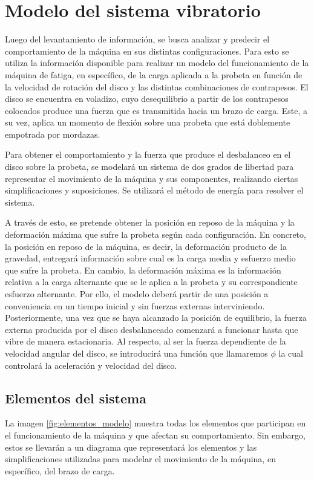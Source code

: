 \section{Modelo del sistema vibratorio}
Luego del levantamiento de información, se busca analizar y predecir el comportamiento de la máquina en sus distintas configuraciones. Para esto se utiliza la información disponible para realizar un modelo del funcionamiento de la máquina de fatiga, en específico, de la carga aplicada a la probeta en función de la velocidad de rotación del disco y las distintas combinaciones de contrapesos. El disco se encuentra en voladizo, cuyo desequilibrio a partir de los contrapesos colocados produce una fuerza que es transmitida hacia un brazo de carga. Este, a su vez, aplica un momento de flexión sobre una probeta que está doblemente empotrada por mordazas.

Para obtener el comportamiento y la fuerza que produce el desbalanceo en el disco sobre la probeta, se modelará un sistema de dos grados de libertad para representar el movimiento de la máquina y sus componentes, realizando ciertas simplificaciones y suposiciones. Se utilizará el método de energía para resolver el sistema.

A través de esto, se pretende obtener la posición en reposo de la máquina y la deformación máxima que sufre la probeta según cada configuración. En concreto, la posición en reposo de la máquina, es decir, la deformación producto de la gravedad, entregará información sobre cual es la carga media y esfuerzo medio que sufre la probeta. En cambio, la deformación máxima es la información relativa a la carga alternante que se le aplica a la probeta y su correspondiente esfuerzo alternante. Por ello, el modelo deberá partir de una posición a conveniencia en un tiempo inicial y sin fuerzas externas interviniendo. Posteriormente, una vez que se haya alcanzado la posición de equilibrio, la fuerza externa producida por el disco desbalanceado comenzará a funcionar hasta que vibre de manera estacionaria. Al respecto, al ser la fuerza dependiente de la velocidad angular del disco, se introducirá una función que llamaremos $\phi$ la cual controlará la aceleración y velocidad del disco.

\subsection{Elementos del sistema}
La imagen \ref{fig:elementos_modelo} muestra todas los elementos que participan en el funcionamiento de la máquina y que afectan su comportamiento. Sin embargo, estos se llevarán a un diagrama que representará los elementos y las simplificaciones utilizadas para modelar el movimiento de la máquina, en específico, del brazo de carga.  

